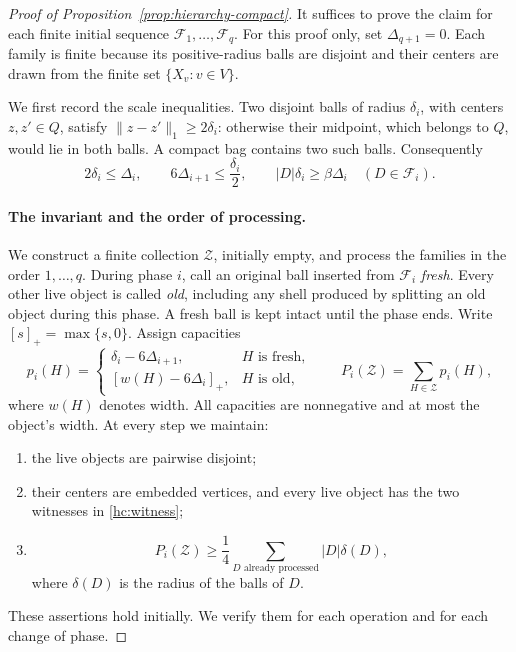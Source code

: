 \begin{proof}[Proof of Proposition~\ref{prop:hierarchy-compact}]
It suffices to prove the claim for each finite initial sequence
\(\mathcal F_1,\ldots,\mathcal F_q\).  For this proof only, set
\(\Delta_{q+1}=0\).  Each family is finite because its positive-radius
balls are disjoint and their centers are drawn from the finite set
\(\{X_v:v\in V\}\).

We first record the scale inequalities.  Two disjoint balls of radius
\(\delta_i\), with centers \(z,z'\in Q\), satisfy
\(\|z-z'\|_1\ge2\delta_i\): otherwise their midpoint, which belongs
to \(Q\), would lie in both balls.  A compact bag contains two such
balls.  Consequently
\begin{equation}
\label{hc:scales}
 2\delta_i\le\Delta_i,
 \qquad
 6\Delta_{i+1}\le\frac{\delta_i}{2},
 \qquad
 |D|\delta_i\ge \beta\Delta_i
 \quad(D\in\mathcal F_i).
\end{equation}

\paragraph{The invariant and the order of processing.}
We construct a finite collection \(\mathcal Z\), initially empty,
and process the families in the order \(1,\ldots,q\).
During phase \(i\), call an original ball inserted from
\(\mathcal F_i\) \emph{fresh}.  Every other live object is called
\emph{old}, including any shell produced by splitting an old object
during this phase.  A fresh ball is kept intact until the phase ends.
Write \([s]_+=\max\{s,0\}\).  Assign capacities
\begin{equation}
\label{hc:capacity}
 p_i(H)=
 \begin{cases}
  \delta_i-6\Delta_{i+1},&H\text{ is fresh},\\
  [w(H)-6\Delta_i]_+,&H\text{ is old},
 \end{cases}
 \qquad P_i(\mathcal Z)=\sum_{H\in\mathcal Z}p_i(H),
\end{equation}
where \(w(H)\) denotes width.  All capacities are nonnegative and
at most the object's width.  At every step we maintain:
\begin{enumerate}[label=(\roman*),leftmargin=*]
\item the live objects are pairwise disjoint;
\item their centers are embedded vertices, and every live object has
      the two witnesses in \eqref{hc:witness};
\item
\begin{equation}
\label{hc:potential-invariant}
 P_i(\mathcal Z)\ge
 \frac14\sum_{D\text{ already processed}}|D|\delta(D),
\end{equation}
where \(\delta(D)\) is the radius of the balls of \(D\).
\end{enumerate}
These assertions hold initially.  We verify them for each operation
and for each change of phase.


\end{proof}
